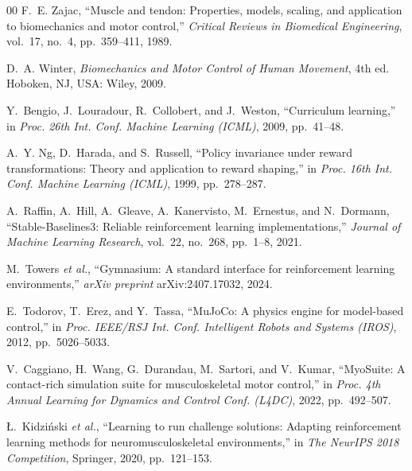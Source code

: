 \documentclass[conference]{IEEEtran}
\begin{document}
\begin{thebibliography}{00}
F.~E. Zajac, ``Muscle and tendon: Properties, models, scaling, and application
to biomechanics and motor control,'' \emph{Critical Reviews in Biomedical
Engineering}, vol.~17, no.~4, pp.~359--411, 1989.

D.~A. Winter, \emph{Biomechanics and Motor Control of Human Movement}, 4th ed.
Hoboken, NJ, USA: Wiley, 2009.

Y.~Bengio, J.~Louradour, R.~Collobert, and J.~Weston, ``Curriculum learning,''
in \emph{Proc. 26th Int. Conf. Machine Learning (ICML)}, 2009, pp.~41--48.

A.~Y. Ng, D.~Harada, and S.~Russell, ``Policy invariance under reward
transformations: Theory and application to reward shaping,'' in \emph{Proc.
16th Int. Conf. Machine Learning (ICML)}, 1999, pp.~278--287.

A.~Raffin, A.~Hill, A.~Gleave, A.~Kanervisto, M.~Ernestus, and N.~Dormann,
``Stable-Baselines3: Reliable reinforcement learning implementations,''
\emph{Journal of Machine Learning Research}, vol.~22, no.~268, pp.~1--8, 2021.

M.~Towers \emph{et al.}, ``Gymnasium: A standard interface for reinforcement
learning environments,'' \emph{arXiv preprint} arXiv:2407.17032, 2024.

E.~Todorov, T.~Erez, and Y.~Tassa, ``MuJoCo: A physics engine for model-based
control,'' in \emph{Proc. IEEE/RSJ Int. Conf. Intelligent Robots and Systems
(IROS)}, 2012, pp.~5026--5033.

V.~Caggiano, H.~Wang, G.~Durandau, M.~Sartori, and V.~Kumar, ``MyoSuite: A
contact-rich simulation suite for musculoskeletal motor control,'' in
\emph{Proc. 4th Annual Learning for Dynamics and Control Conf. (L4DC)}, 2022,
pp.~492--507.

{\L}.~Kidzi{\'n}ski \emph{et al.}, ``Learning to run challenge solutions:
Adapting reinforcement learning methods for neuromusculoskeletal
environments,'' in \emph{The NeurIPS 2018 Competition}, Springer, 2020,
pp.~121--153.

\end{thebibliography}
\end{document}
